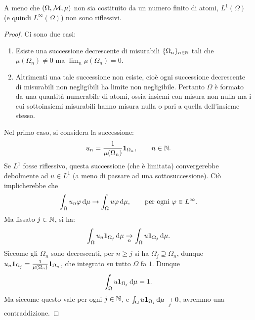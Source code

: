 \begin{theorem}
	A meno che $(\Omega, \M, \mu)$ non sia costituito da un numero finito di atomi, $L^1(\Omega)$ (e quindi $L^\infty(\Omega)$) non sono riflessivi.
\end{theorem}
\begin{proof}
	Ci sono due casi:
	\begin{enumerate}
		\item Esiste una successione decrescente di misurabili $\{\Omega_n\}_{n \in \N}$ tali che $\mu(\Omega_n) \neq 0$ ma $\lim_n \mu(\Omega_n) = 0$.

		\item Altrimenti una tale successione non esiste, cioè ogni successione decrescente di misurabili non negligibili ha limite non negligibile. Pertanto $\Omega$ è formato da una quantità numerabile di atomi, ossia insiemi con misura non nulla ma i cui sottoinsiemi misurabili hanno misura nulla o pari a quella dell'insieme stesso.
	\end{enumerate}

	Nel primo caso, si considera la successione:
	\begin{equation*}
		u_n = \frac1{\mu(\Omega_n)} \ind_{\Omega_n}, \qquad n \in \N.
	\end{equation*}
	Se $L^1$ fosse riflessivo, questa successione (che è limitata) convergerebbe debolmente ad $u \in L^1$ (a meno di passare ad una sottosuccessione). Ciò implicherebbe che
	\begin{equation*}
		\int_\Omega u_n \varphi \,\de\mu \conv \int_\Omega u \varphi\,\de\mu, \qquad \text{per ogni $\varphi \in L^\infty$}.
	\end{equation*}
	Ma fissato $j \in \N$, si ha:
	\begin{equation*}
		\int_\Omega u_n \ind_{\Omega_j} \,\de\mu \conv[n] \int_\Omega u \ind_{\Omega_j}\,\de\mu.
	\end{equation*}
	Siccome gli $\Omega_n$ sono decrescenti, per $n \geq j$ si ha $\Omega_j \supseteq \Omega_n$, dunque $u_n \ind_{\Omega_j} = \frac1{\mu(\Omega_n)} \ind_{\Omega_n}$, che integrato su tutto $\Omega$ fa $1$. Dunque
	\begin{equation*}
		\int_\Omega u \ind_{\Omega_j} \,\de\mu = 1.
	\end{equation*}
	Ma siccome questo vale per ogni $j \in \N$, e $\int_\Omega u \ind_{\Omega_j}\,\de\mu \conv[j] 0$, avremmo una contraddizione.


\end{proof}
